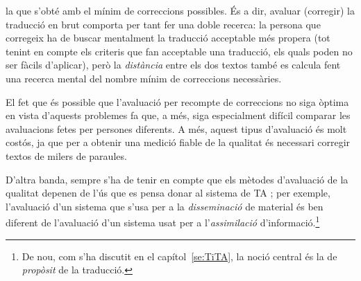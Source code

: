 \begin{enumerate}
\begin{enumerate}
\begin{itemize}
  la que s'obté amb el mínim de correccions possibles. És a dir,
  avaluar (corregir) la traducció en brut comporta per tant fer una
  doble recerca: la persona que corregeix ha de buscar mentalment la
  traducció acceptable més propera (tot tenint en compte els criteris
  que fan acceptable una traducció, els quals poden no ser fàcils
  d'aplicar), però la \emph{distància} entre els dos textos també es
  calcula fent una recerca mental del nombre mínim de correccions
  necessàries.
\end{itemize}
  El fet que és
possible que l'avaluació per recompte de correccions no siga òptima en
vista d'aquests problemes fa que, a més, siga especialment difícil
comparar les avaluacions fetes per persones diferents. A més, aquest
tipus d'avaluació és molt costós, ja que per a obtenir una medició
fiable de la qualitat és necessari corregir textos de milers de
paraules.

D'altra banda, sempre s'ha de tenir en compte que els mètodes
d'avaluació de la qualitat depenen de l'ús que es pensa donar al
sistema de TA \citep{arnold93j}; per exemple, l'avaluació d'un sistema
que s'usa per a la \emph{disseminació} de material és ben diferent de
l'avaluació d'un sistema usat per a l'\emph{assimilació}
d'informació.\footnote{De nou, com s'ha discutit en el capítol~\ref{se:TiTA}, la
  noció central és la de \emph{propòsit} de la traducció.}


\end{enumerate}
\end{enumerate}
